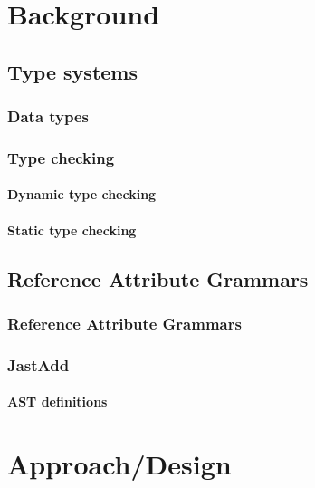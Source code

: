 \documentclass[nofilelist]{cslthse-msc}
\begin{document}
\chapter{Background}
\section{Type systems}
\subsection{Data types}
\subsection{Type checking}
\subsubsection{Dynamic type checking}
\subsubsection{Static type checking}

\section{Reference Attribute Grammars}
\subsection{Reference Attribute Grammars}
\subsection{JastAdd}
\subsubsection{AST definitions}\label{astdef}


\chapter{Approach/Design} %
\end{document}
